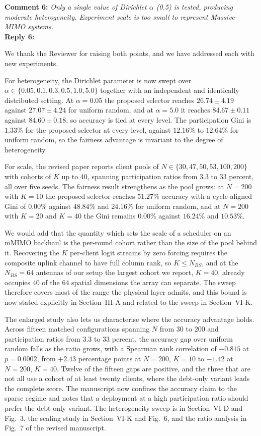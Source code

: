 \documentclass[10pt]{article}
\begin{document}
\noindent
\textbf{Comment 6:} \textit{Only a single value of Dirichlet $\alpha$ (0.5) is tested, producing moderate heterogeneity. Experiment scale is too small to represent Massive-MIMO systems.} \\
\noindent
\textbf{Reply 6:} {We thank the Reviewer for raising both points, and we have addressed each with new experiments.

For heterogeneity, the Dirichlet parameter is now swept over $\alpha \in \{0.05, 0.1, 0.3, 0.5, 1.0, 5.0\}$ together with an independent and identically distributed setting. At $\alpha = 0.05$ the proposed selector reaches $26.74 \pm 4.19$ against $27.07 \pm 4.24$ for uniform random, and at $\alpha = 5.0$ it reaches $84.67 \pm 0.11$ against $84.60 \pm 0.18$, so accuracy is tied at every level. The participation Gini is $1.33\%$ for the proposed selector at every level, against $12.16\%$ to $12.64\%$ for uniform random, so the fairness advantage is invariant to the degree of heterogeneity.

For scale, the revised paper reports client pools of $N \in \{30, 47, 50, 53, 100, 200\}$ with cohorts of $K$ up to $40$, spanning participation ratios from $3.3$ to $33$ percent, all over five seeds. The fairness result strengthens as the pool grows: at $N = 200$ with $K = 10$ the proposed selector reaches $51.27\%$ accuracy with a cycle-aligned Gini of $0.00\%$ against $48.84\%$ and $24.16\%$ for uniform random, and at $N = 200$ with $K = 20$ and $K = 40$ the Gini remains $0.00\%$ against $16.24\%$ and $10.53\%$.

We would add that the quantity which sets the scale of a scheduler on an mMIMO backhaul is the per-round cohort rather than the size of the pool behind it. Recovering the $K$ per-client logit streams by zero forcing requires the composite uplink channel to have full column rank, so $K \le N_{BS}$, and at the $N_{BS} = 64$ antennas of our setup the largest cohort we report, $K = 40$, already occupies $40$ of the $64$ spatial dimensions the array can separate. The sweep therefore covers most of the range the physical layer admits, and this bound is now stated explicitly in Section~III-A and related to the sweep in Section~VI-K.

The enlarged study also lets us characterise where the accuracy advantage holds. Across fifteen matched configurations spanning $N$ from $30$ to $200$ and participation ratios from $3.3$ to $33$ percent, the accuracy gap over uniform random falls as the ratio grows, with a Spearman rank correlation of $-0.815$ at $p = 0.0002$, from $+2.43$ percentage points at $N = 200$, $K = 10$ to $-1.42$ at $N = 200$, $K = 40$. Twelve of the fifteen gaps are positive, and the three that are not all use a cohort of at least twenty clients, where the debt-only variant leads the complete score. The manuscript now confines the accuracy claim to the sparse regime and notes that a deployment at a high participation ratio should prefer the debt-only variant. The heterogeneity sweep is in Section~VI-D and Fig.~3, the scaling study in Section~VI-K and Fig.~6, and the ratio analysis in Fig.~7 of the revised manuscript.}\\
\end{document}
